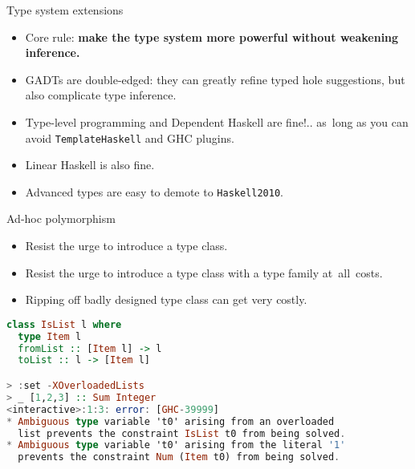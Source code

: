 \documentclass[handout]{beamer}
\begin{document}
\begin{frame}{Type system extensions}

\begin{itemize}[<+->]\itemsep3ex
  \item Core rule:
        {\bf make the type system more powerful without weakening inference.}

  \item GADTs are double-edged:
        they can greatly refine typed hole suggestions,
        but also complicate type inference.

  \item Type-level programming and Dependent Haskell are fine!..
        as~long as you can avoid {\tt TemplateHaskell} and GHC plugins.

  \item Linear Haskell is also fine.

  \item Advanced types are easy to demote to {\tt Haskell2010}.

\end{itemize}

\end{frame}

\begin{frame}[fragile]{Ad-hoc polymorphism}

\begin{itemize}[<+->]
  \item Resist the urge to introduce a type class.
  \item Resist the urge to introduce a type class with a type family at~all~costs.
  \item Ripping off badly designed type class can get very costly.
\end{itemize}

\pause

\begin{lstlisting}[language=Haskell]
class IsList l where
  type Item l
  fromList :: [Item l] -> l
  toList :: l -> [Item l]

> :set -XOverloadedLists
> _ [1,2,3] :: Sum Integer
<interactive>:1:3: error: [GHC-39999]
* Ambiguous type variable 't0' arising from an overloaded
  list prevents the constraint IsList t0 from being solved.
* Ambiguous type variable 't0' arising from the literal '1'
  prevents the constraint Num (Item t0) from being solved.
\end{lstlisting}

\end{frame}
\end{document}
